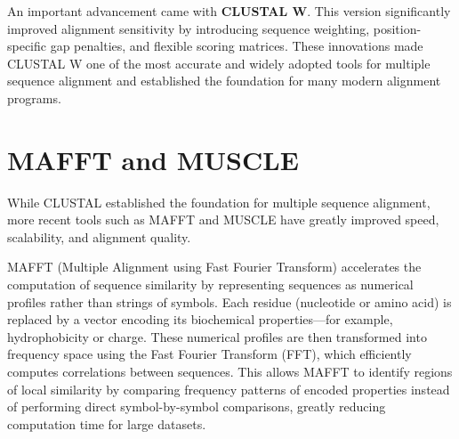 An important advancement came with \textbf{CLUSTAL W}.
This version significantly improved alignment sensitivity by introducing sequence weighting, position-specific gap penalties, and flexible scoring matrices. These innovations made CLUSTAL W one of the most accurate and widely adopted tools for multiple sequence alignment and established the foundation for many modern alignment programs.

\section{MAFFT and MUSCLE}

While CLUSTAL established the foundation for multiple sequence alignment, more recent tools such as MAFFT and MUSCLE have greatly improved speed, scalability, and alignment quality.  

MAFFT (Multiple Alignment using Fast Fourier Transform)
accelerates the computation of sequence similarity by representing sequences as numerical profiles rather than strings of symbols. Each residue (nucleotide or amino acid) is replaced by a vector encoding its biochemical properties—for example, hydrophobicity or charge. These numerical profiles are then transformed into frequency space using the Fast Fourier Transform (FFT), which efficiently computes correlations between sequences. This allows MAFFT to identify regions of local similarity by comparing frequency patterns of encoded properties instead of performing direct symbol-by-symbol comparisons, greatly reducing computation time for large datasets.

